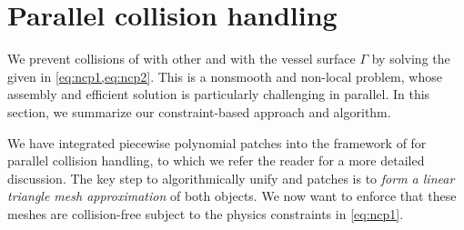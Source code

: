 \section{Parallel collision handling}
\label{sec:parallel-contact}
We prevent collisions of \rbcs with other \rbcs and with the vessel
surface $\Gamma$ by solving the \ncp given in \cref{eq:ncp1,eq:ncp2}. 
This is a nonsmooth and non-local problem, whose assembly and efficient solution
is particularly challenging in parallel.%
In this section, we summarize our constraint-based approach and algorithm.

We have integrated piecewise polynomial patches into the framework of \cite{lu2018parallel} 
for parallel collision handling, to which we refer the reader for a more detailed discussion. 
The key step to algorithmically unify \rbcs and patches is to \textit{form a linear triangle
mesh approximation} of both objects.
We now want to enforce that these meshes are collision-free subject to the
physics constraints in \cref{eq:ncp1}.

